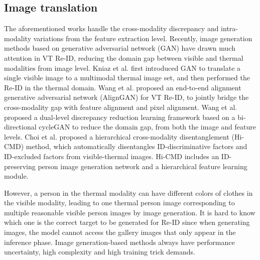 \documentclass[journal]{IEEEtran}
\begin{document}
\subsection{Image translation}
The aforementioned works handle the cross-modality discrepancy and intra-modality variations from the feature extraction level. Recently, image generation methods based on generative adversarial network (GAN) have drawn much attention in VT Re-ID, reducing the domain gap between visible and thermal modalities from image level.
Kniaz et al. \cite{kniaz2018thermalgan} first introduced GAN to translate a single visible image to a multimodal thermal image set, and then performed the Re-ID in the thermal domain.
Wang et al. \cite{wang2019rgb} proposed an end-to-end alignment generative adversarial network (AlignGAN) for VT Re-ID, to jointly bridge the cross-modality gap with feature alignment and pixel alignment.
Wang et al. \cite{wang2019learning1} proposed a dual-level discrepancy reduction learning framework based on a bi-directional cycleGAN to reduce the domain gap, from both the image and feature levels.
Choi et al. \cite{choi2020hi} proposed a hierarchical cross-modality disentanglement (Hi-CMD) method, which automatically disentangles ID-discriminative factors and ID-excluded factors from visible-thermal images. Hi-CMD includes an ID-preserving person image generation network and a hierarchical feature learning module.

However, a person in the thermal modality can have different colors of clothes in the visible modality, leading to one thermal person image corresponding to multiple reasonable visible person images by image generation. It is hard to know which one is the correct target to be generated for Re-ID since when generating images, the model cannot access the gallery images that only appear in the inference phase.
Image generation-based methods always have performance uncertainty, high complexity and high training trick demands.
\end{document}
